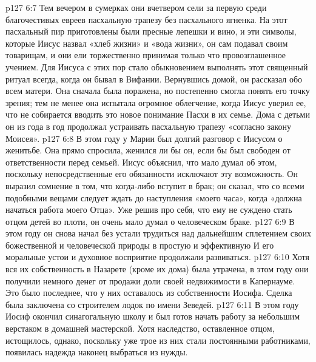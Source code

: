 \vs p127 6:7 Тем вечером в сумерках они вчетвером сели за первую среди благочестивых евреев пасхальную трапезу без пасхального ягненка. На этот пасхальный пир приготовлены были пресные лепешки и вино, и эти символы, которые Иисус назвал «хлеб жизни» и «вода жизни», он сам подавал своим товарищам, и они ели торжественно принимая только что провозглашенное учением. Для Иисуса с этих пор стало обыкновением выполнять этот священный ритуал всегда, когда он бывал в Вифании. Вернувшись домой, он рассказал обо всем матери. Она сначала была поражена, но постепенно смогла понять его точку зрения; тем не менее она испытала огромное облегчение, когда Иисус уверил ее, что не собирается вводить это новое понимание Пасхи в их семье. Дома с детьми он из года в год продолжал устраивать пасхальную трапезу «согласно закону Моисея».
\vs p127 6:8 \pc В этом году у Марии был долгий разговор с Иисусом о женитьбе. Она прямо спросила, женился ли бы он, если бы был свободен от ответственности перед семьей. Иисус объяснил, что мало думал об этом, поскольку непосредственные его обязанности исключают эту возможность. Он выразил сомнение в том, что когда\hyp{}либо вступит в брак; он сказал, что со всеми подобными вещами следует ждать до наступления «моего часа», когда «должна начаться работа моего Отца». Уже решив про себя, что ему не суждено стать отцом детей во плоти, он очень мало думал о человеческом браке.
\vs p127 6:9 В этом году он снова начал без устали трудиться над дальнейшим сплетением своих божественной и человеческой природы в простую и эффективную  И его моральные устои и духовное восприятие продолжали развиваться.
\vs p127 6:10 Хотя вся их собственность в Назарете (кроме их дома) была утрачена, в этом году они получили немного денег от продажи доли своей недвижимости в Капернауме. Это было последнее, что у них оставалось из собственности Иосифа. Сделка была заключена со строителем лодок по имени Зеведей.
\vs p127 6:11 В этом году Иосиф окончил синагогальную школу и был готов начать работу за небольшим верстаком в домашней мастерской. Хотя наследство, оставленное отцом, истощилось, однако, поскольку уже трое из них стали постоянными работниками, появилась надежда наконец выбраться из нужды.
